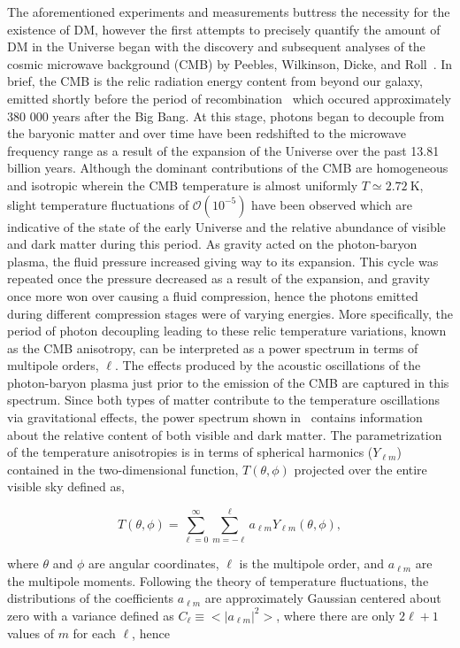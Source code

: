 The aforementioned experiments and measurements buttress the necessity for the existence of DM, however the first attempts to precisely quantify the amount of DM in the Universe began with the discovery and subsequent analyses of the cosmic microwave background (CMB) by Peebles, Wilkinson, Dicke, and Roll~\cite{Dicke1965}. In brief, the CMB is the relic radiation energy content from beyond our galaxy, emitted shortly before the period of recombination~\cite{Seager:1999km} which occured approximately 380 000 years after the Big Bang. At this stage, photons began to decouple from the baryonic matter and over time have been redshifted to the microwave frequency range as a result of the expansion of the Universe over the past 13.81 billion years. Although the dominant contributions of the CMB are homogeneous and isotropic wherein the CMB temperature is almost uniformly $T\simeq2.72\:\mathrm{K}$, slight temperature fluctuations of $\mathcal{O}(10^{-5})$ have been observed which are indicative of the state of the early Universe and the relative abundance of visible and dark matter during this period. As gravity acted on the photon-baryon plasma, the fluid pressure increased giving way to its expansion. This cycle was repeated once the pressure decreased as a result of the expansion, and gravity once more won over causing a fluid compression, hence the photons emitted during different compression stages were of varying energies. More specifically, the period of photon decoupling leading to these relic temperature variations, known as the CMB anisotropy, can be interpreted as a power spectrum in terms of multipole orders, $\ell$. The effects produced by the acoustic oscillations of the photon-baryon plasma just prior to the emission of the CMB are captured in this spectrum. Since both types of matter contribute to the temperature oscillations via gravitational effects, the power spectrum shown in~ contains information about the relative content of both visible and dark matter. The parametrization of the temperature anisotropies is in terms of spherical harmonics ($Y_{\ell m}$) contained in the two-dimensional function, $T(\theta,\phi)$ projected over the entire visible sky defined as,

\begin{equation}
  T(\theta,\phi) = \sum^{\infty}_{\ell=0}\sum^{\ell}_{m=-\ell}a_{\ell m}Y_{\ell m}(\theta,\phi),
\end{equation}

where $\theta$ and $\phi$ are angular coordinates, $\ell$ is the multipole order, and $a_{\ell m}$ are the multipole moments. Following the theory of temperature fluctuations, the distributions of the coefficients $a_{\ell m}$ are approximately Gaussian centered about zero with a variance defined as $C_{\ell} \equiv <|a_{\ell m}|^{2}>$, where there are only $2\ell+1$ values of $m$ for each $\ell$, hence

